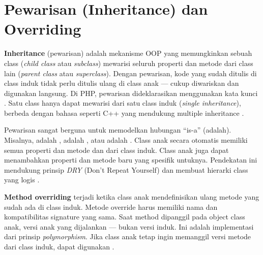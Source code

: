 ﻿\section{Pewarisan (Inheritance) dan Overriding}

\textbf{Inheritance} (pewarisan) adalah mekanisme OOP yang memungkinkan sebuah class (\textit{child class} atau \textit{subclass}) mewarisi seluruh properti dan metode dari class lain (\textit{parent class} atau \textit{superclass}). Dengan pewarisan, kode yang sudah ditulis di class induk tidak perlu ditulis ulang di class anak --- cukup diwariskan dan digunakan langsung. Di PHP, pewarisan dideklarasikan menggunakan kata kunci . Satu class hanya dapat mewarisi dari satu class induk (\textit{single inheritance}), berbeda dengan bahasa seperti C++ yang mendukung multiple inheritance \cite{phpManual}.

Pewarisan sangat berguna untuk memodelkan hubungan ``is-a'' (adalah). Misalnya,  adalah ,  adalah , atau  adalah . Class anak secara otomatis memiliki semua properti dan metode  dan  dari class induk. Class anak juga dapat menambahkan properti dan metode baru yang spesifik untuknya. Pendekatan ini mendukung prinsip \textit{DRY} (Don't Repeat Yourself) dan membuat hierarki class yang logis \cite{phpRightWay}.

\textbf{Method overriding} terjadi ketika class anak mendefinisikan ulang metode yang sudah ada di class induk. Metode override harus memiliki nama dan kompatibilitas signature yang sama. Saat method dipanggil pada object class anak, versi anak yang dijalankan --- bukan versi induk. Ini adalah implementasi dari prinsip \textit{polymorphism}. Jika class anak tetap ingin memanggil versi metode dari class induk, dapat digunakan  \cite{phpManual}.

